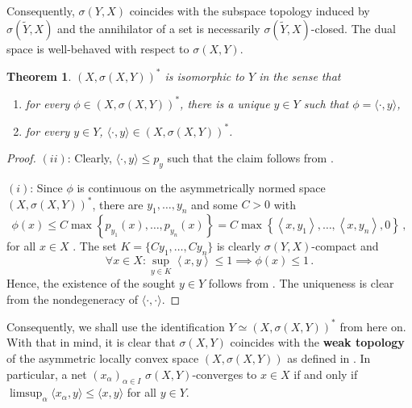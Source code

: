 \documentclass[
	paper=A4,
	pagesize=auto,
	fontsize=12pt
]{scrartcl}
\theoremstyle{plain}
\newtheorem{theorem}{Theorem}[section]
\theoremstyle{remark}
\theoremstyle{definition}
\begin{document}
%
Consequently, $\sigma(Y, X)$ coincides with the subspace topology induced by $\sigma(\widetilde{Y}, X)$ and the annihilator of a set is necessarily $\sigma(\widetilde{Y}, X)$-closed.
The dual space is well-behaved with respect to $\sigma(X, Y)$.
%
\begin{theorem}
$(X, \sigma(X, Y))^*$ is isomorphic to $Y$ in the sense that
%
\begin{enumerate}
\item for every $\phi \in (X, \sigma(X, Y))^*$, there is a unique $y \in Y$ such that $\phi = \langle \cdot, y \rangle$,
\item for every $y \in Y$, $\langle \cdot, y \rangle \in (X, \sigma(X, Y))^*$.
\end{enumerate}
\end{theorem}
\begin{proof}
$(ii)$:
Clearly, $\langle \cdot, y \rangle \le p_y$ such that the claim follows from \cite[Proposition 2.1.11]{src:Cobzaş:FunctionalAnalysisinAsymmetricNormedSpaces}.

$(i)$:
Since $\phi$ is continuous on the asymmetrically normed space $(X, \sigma(X, Y))^*$, there are $y_1, \dots, y_n$ and some $C > 0$ with
%
\begin{equation}
\phi \left( x \right)
\le
C
\max \left\{ p_{y_1}\left( x \right), \dots, p_{y_n}\left( x \right) \right\}
=
C \max \left\{ \left< x, y_1 \right>, \dots, \left< x, y_n \right>, 0 \right\}  \, ,
\end{equation}
%
for all $x \in X$ \cite[Proposition 2.1.11]{src:Cobzaş:FunctionalAnalysisinAsymmetricNormedSpaces}.
The set $K = \{ C y_1, \dots, C y_n \}$ is clearly $\sigma(Y, X)$-compact and
%
\begin{equation}
\forall x \in X:
\sup_{y \in K} \left< x, y \right> \le 1
\implies
\phi \left( x \right) \le 1 \, .
\end{equation}
%
Hence, the existence of the sought $y \in Y$ follows from \cite[Theorem 3.8]{src:KeimelRoth:OrderedConesAndApproximation}.
The uniqueness is clear from the nondegeneracy of $\langle \cdot, \cdot \rangle$. 
\end{proof}
%
Consequently, we shall use the identification $Y \simeq (X, \sigma(X, Y))^*$ from here on.
With that in mind, it is clear that $\sigma(X, Y)$ coincides with the \textbf{weak topology} of the asymmetric locally convex space $(X, \sigma(X, Y))$ as defined in \cite[Section 2.4.6]{src:Cobzaş:FunctionalAnalysisinAsymmetricNormedSpaces}.
In particular, a net $(x_\alpha)_{\alpha \in I}$ $\sigma(X, Y)$-converges to $x \in X$ if and only if $\limsup_{\alpha} \langle x_\alpha, y \rangle \le \langle x, y \rangle$ for all $y \in Y$.
\end{document}
